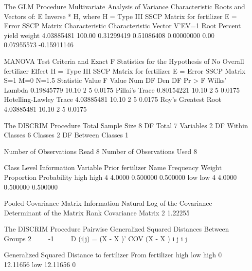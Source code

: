 \documentclass{article}
\begin{document}
\begin{Woutput}
The GLM Procedure
Multivariate Analysis of Variance
Characteristic Roots and Vectors of: E Inverse * H, where
         H = Type III SSCP Matrix for fertilizer
                  E = Error SSCP Matrix
Characteristic               Characteristic Vector  V'EV=1
          Root    Percent           yield          weight
    4.03885481     100.00      0.31299419      0.51086408
    0.00000000       0.00      0.07955573     -0.15911146

MANOVA Test Criteria and Exact F Statistics for the Hypothesis of No Overall fertilizer Effect
                           H = Type III SSCP Matrix for fertilizer
                                    E = Error SSCP Matrix
                                     S=1    M=0    N=1.5
Statistic                        Value    F Value    Num DF    Den DF    Pr > F
Wilks' Lambda               0.19845779      10.10         2         5    0.0175
Pillai's Trace              0.80154221      10.10         2         5    0.0175
Hotelling-Lawley Trace      4.03885481      10.10         2         5    0.0175
Roy's Greatest Root         4.03885481      10.10         2         5    0.0175

The DISCRIM Procedure
Total Sample Size        8          DF Total                 7
Variables                2          DF Within Classes        6
Classes                  2          DF Between Classes       1

Number of Observations Read              8
Number of Observations Used              8

                           Class Level Information
              Variable                                                  Prior
fertilizer    Name        Frequency       Weight    Proportion    Probability
high          high                4       4.0000      0.500000       0.500000
low           low                 4       4.0000      0.500000       0.500000

Pooled Covariance Matrix Information
               Natural Log of the
 Covariance    Determinant of the
Matrix Rank     Covariance Matrix
          2               1.22255

The DISCRIM Procedure
Pairwise Generalized Squared Distances Between Groups
 2         _   _       -1  _   _
D (i|j) = (X - X )' COV   (X - X )
            i   j           i   j

Generalized Squared Distance to fertilizer
From
fertilizer          high           low
high                   0      12.11656
low             12.11656             0


\end{Woutput}
\end{document}
